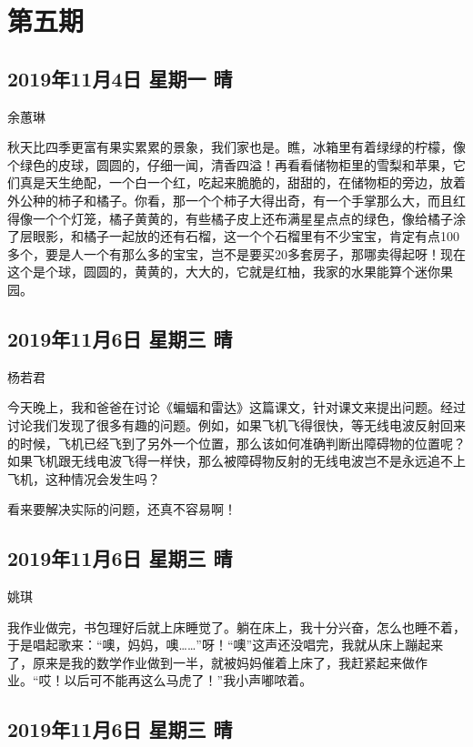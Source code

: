 \chapter{第五期}

\section{2019年11月4日 星期一 晴}

余蕙琳

秋天比四季更富有果实累累的景象，我们家也是。瞧，冰箱里有着绿绿的柠檬，像个绿色的皮球，圆圆的，仔细一闻，清香四溢！再看看储物柜里的雪梨和苹果，它们真是天生绝配，一个白一个红，吃起来脆脆的，甜甜的，在储物柜的旁边，放着外公种的柿子和橘子。你看，那一个个柿子大得出奇，有一个手掌那么大，而且红得像一个个灯笼，橘子黄黄的，有些橘子皮上还布满星星点点的绿色，像给橘子涂了层眼影，和橘子一起放的还有石榴，这一个个石榴里有不少宝宝，肯定有点100多个，要是人一个有那么多的宝宝，岂不是要买20多套房子，那哪卖得起呀！现在这个是个球，圆圆的，黄黄的，大大的，它就是红柚，我家的水果能算个迷你果园。

\section{2019年11月6日 星期三 晴}

杨若君

今天晚上，我和爸爸在讨论《蝙蝠和雷达》这篇课文，针对课文来提出问题。经过讨论我们发现了很多有趣的问题。例如，如果飞机飞得很快，等无线电波反射回来的时候，飞机已经飞到了另外一个位置，那么该如何准确判断出障碍物的位置呢？如果飞机跟无线电波飞得一样快，那么被障碍物反射的无线电波岂不是永远追不上飞机，这种情况会发生吗？

看来要解决实际的问题，还真不容易啊！

\section{2019年11月6日 星期三 晴}

姚琪

我作业做完，书包理好后就上床睡觉了。躺在床上，我十分兴奋，怎么也睡不着，于是唱起歌来：``噢，妈妈，噢\ldots\ldots{}''呀！``噢''这声还没唱完，我就从床上蹦起来了，原来是我的数学作业做到一半，就被妈妈催着上床了，我赶紧起来做作业。``哎！以后可不能再这么马虎了！''我小声嘟哝着。

\section{2019年11月6日 星期三 晴}

